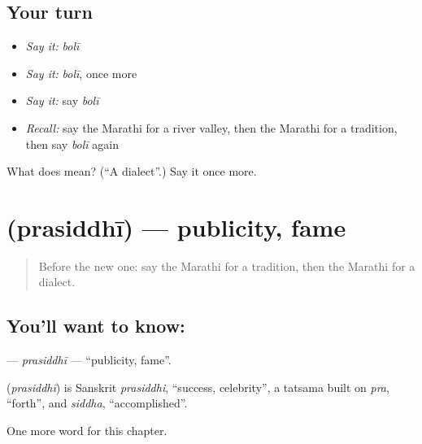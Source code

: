 \subsection*{Your turn}
\begin{itemize}
\raggedright
  \item \emph{Say it:} \emph{bolī}
  \item \emph{Say it:} \emph{bolī}, once more
  \item \emph{Say it:} say \emph{bolī}
  \item \emph{Recall:} say the Marathi for a river valley, then the Marathi for a tradition, then say \emph{bolī} again
\end{itemize}

\begin{tcolorbox}[breakable,colback=teal!4,colframe=teal!35!black,title={Before you move on}]
What does  mean? (\textquotedblleft{}A dialect\textquotedblright{}.) Say it once more.
\end{tcolorbox}
\section[\texorpdfstring{\mr{प्रसिद्धी} (prasiddhī)}{प्रसिद्धी (prasiddhī)}]{ (prasiddhī) — publicity, fame}

\label{lesson:MR-C237-prasiddhi}



\begin{quote}
Before the new one: say the Marathi for a tradition, then the Marathi for a dialect.
\end{quote}

\subsection*{You'll want to know: }
\textbf{} — \emph{prasiddhī} — \textquotedblleft{}publicity, fame\textquotedblright{}.

\begin{cousinweb}
\textbf{} (\emph{prasiddhī}) is Sanskrit \emph{prasiddhi}, \textquotedblleft{}success, celebrity\textquotedblright{}, a tatsama built on \emph{pra}, \textquotedblleft{}forth\textquotedblright{}, and \emph{siddha}, \textquotedblleft{}accomplished\textquotedblright{}.
\end{cousinweb}

\begin{grammarlens}[title={What you've built}]
One more word for this chapter.
\end{grammarlens}

